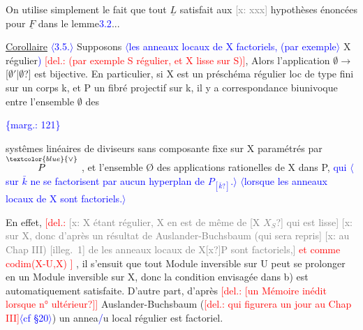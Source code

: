 \documentclass[11pt]{article}
\newcommand{\scanpage}[1]{\par\bigskip\noindent{\small\sffamily[scan #1]}\par}
\newcommand{\mspage}[1]{{\small\sffamily[p.\,#1]}}
\newcommand{\hand}[1]{\textcolor{blue}{#1}}
\newcommand{\inserted}[2][]{\textcolor{blue}{$\langle$#2$\rangle$}}
\newcommand{\margin}[1]{\textcolor{blue}{\{\textsf{marg.:} #1\}}}
\newcommand{\deleted}[1]{\textcolor{red}{[\textsf{del.:} #1]}}
\newcommand{\xout}[1]{\textcolor{gray}{[\textsf{x:} #1]}}
\newcommand{\uline}[1]{\underline{#1}}
\newcommand{\unsure}[1]{[#1?]}
\newcommand{\illegible}[1]{[\textsf{illeg.\ #1}]}
\begin{document}
On utilise simplement le fait que tout $\underline{L}$ satisfait aux \xout{xxx}
hypothèses énoncées pour $\underline{F}$ dans le lemme\hand{3.2}...

\uline{Corollaire} \inserted{3.5.} Supposons \inserted{les anneaux locaux de X factoriels, (par exemple} X régulier\hand{)} \deleted{(par exemple S régulier, et X lisse sur
S)}, Alors l'application $\emptyset \to$ \unsure{$\emptyset'$|$\emptyset$} est bijective. En particulier, si X est
un préschéma régulier loc de type fini sur un corps k, et P un fibré
projectif sur k, il y a correspondance biunivoque entre l'ensemble $\emptyset$ des

\margin{121}

\clearpage
\scanpage{25/122}
\mspage{25}

systêmes linéaires de diviseurs sans composante fixe  sur X paramétrés
par $\overset{\hand{\vee}}{P}$ , et l'ensemble Ø  des applications rationelles de X dans P, \hand{qui}
\inserted{sur $\bar{k}$ ne se factorisent par aucun hyperplan de $P_{\unsure{\bar{k}}}$.}
\inserted[typed]{lorsque les anneaux locaux de X sont factoriels.}

En effet, \deleted{\xout{X étant régulier, X en est de même de \unsure{X $X_S$} qui est lisse}
\xout{sur X, donc d'après un résultat de Auslander-Buchsbaum (qui sera repris}
\xout{au Chap III) \illegible{1} de les anneaux locaux de X\unsure{x}P sont factoriels,}
et comme codim(X-U,X) \quad 2} , il s'ensuit que tout Module inversible sur
U peut se prolonger en un Module inversible sur X, donc la condition
envisagée dans b) est automatiquement satisfaite. D'autre part, d'après
\deleted{\unsure{un Mémoire inédit lorsque n° ultérieur}}
Auslander-Buchsbaum (\deleted{qui figurera un jour au Chap III}\inserted{cf §20}) un annea\hand{/}u local
régulier est factoriel.
\end{document}
